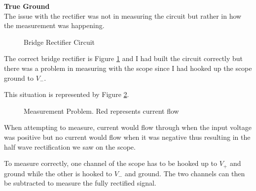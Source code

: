 \documentclass[oneside]{tufte-book}
\newenvironment{loggentry}[2]%
{\noindent\huge{\textbf{#2}}\normalsize\vspace{0.5cm}\marginnote{#1}\\}{\vspace{0.5cm}}
\begin{document}
\begin{loggentry}{2018-Aug-29}{True Ground}

    The issue with the rectifier was not in measuring the circuit but rather in how the measurement was happening.

  \begin{figure}
      \centering
      
      \caption{Bridge Rectifier Circuit}
      \label{correctBridgeRectifier}
  \end{figure}

    The correct bridge rectifier is Figure \ref{correctBridgeRectifier} and I had built the circuit correctly but there was a problem in measuring with the scope since I had hooked up the scope ground to $V_-$.

    This situation is represented by Figure \ref{bridgeRectifierProblem}.

    \begin{figure}
        \centering
        
        \caption{Measurement Problem. Red represents current flow}
        \label{bridgeRectifierProblem}
    \end{figure}

    When attempting to measure, current would flow through when the input voltage was positive but no current would flow when it was negative thus resulting in the half wave rectification we saw on the scope.

    To measure correctly, one channel of the scope has to be hooked up to $V_+$ and ground while the other is hooked to $V_-$ and ground. The two channels can then be subtracted to measure the fully rectified signal.

\end{loggentry}
\end{document}

